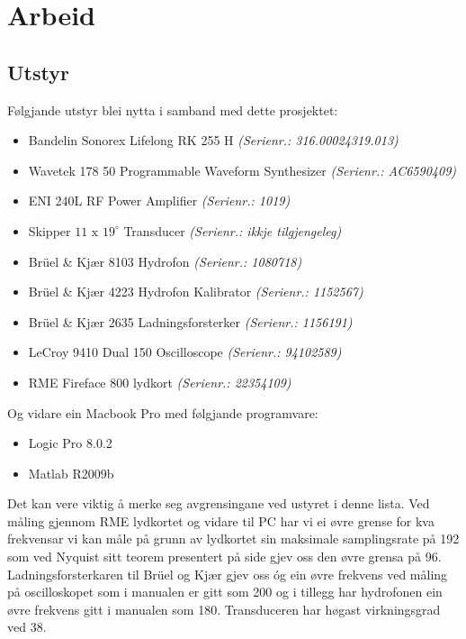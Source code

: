 \section{Arbeid}
\subsection{Utstyr}
Følgjande utstyr blei nytta i samband med dette prosjektet:
\begin{itemize}
\item Bandelin Sonorex Lifelong RK 255 H \textit{(Serienr.: 316.00024319.013)}
\item Wavetek 178 \unit{50}{\mega\hertz} Programmable Waveform Synthesizer \textit{(Serienr.: AC6590409)}
\item ENI 240L RF Power Amplifier \textit{(Serienr.: 1019)}
\item Skipper $11\text{ x }{19}^\circ$ Transducer \textit{(Serienr.: ikkje tilgjengeleg)}
\item Brüel \& Kjær 8103 Hydrofon \textit{(Serienr.: 1080718)}
\item Brüel \& Kjær 4223 Hydrofon Kalibrator \textit{(Serienr.: 1152567)}
\item Brüel \& Kjær 2635 Ladningsforsterker \textit{(Serienr.: 1156191)}
\item LeCroy 9410 Dual \unit{150}{\mega\hertz} Oscilloscope \textit{(Serienr.: 94102589)}
\item RME Fireface 800 lydkort \textit{(Serienr.: 22354109)}
\end{itemize}

Og vidare ein Macbook Pro med følgjande programvare:

\begin{itemize}
\item Logic Pro 8.0.2
\item Matlab R2009b
\end{itemize}

Det kan vere viktig å merke seg avgrensingane ved ustyret i denne lista. Ved måling gjennom RME lydkortet og vidare til PC har vi ei øvre grense for kva frekvensar vi kan måle på grunn av lydkortet sin maksimale samplingsrate på \unit{192}{\kilo\hertz} som ved Nyquist sitt teorem presentert på side \pageref{nyquist} gjev oss den øvre grensa på \unit{96}{\kilo\hertz}. Ladningsforsterkaren til Brüel og Kjær gjev oss óg ein øvre frekvens ved måling på oscilloskopet som i manualen er gitt som \unit{200}{\kilo\hertz} \cite{ladnforsterker} og i tillegg har hydrofonen ein øvre frekvens gitt i manualen som \unit{180}{\kilo\hertz}\cite{hydrofon}. Transduceren har høgast virkningsgrad ved \unit{38}{\kilo\hertz}. 

